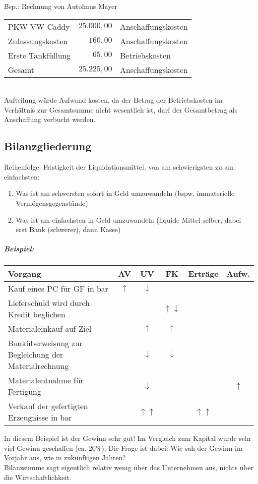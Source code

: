 \documentclass{scrreprt}
\begin{document}
\begin{itemize}
Bsp.: Rechnung von Autohaus Mayer\\
\begin{tabular}{l r l}
PKW VW Caddy & $25.000,00$ & Anschaffungskosten\\
Zulassungskosten & $160,00$ & Anschaffungskosten\\
Erste Tankfüllung & $65,00$ & Betriebskosten\\
\hline
Gesamt	& $25.225,00$	& Anschaffungskosten\\
\end{tabular}\\
Aufteilung würde Aufwand kosten, da der Betrag der Betriebskosten im Verhältnis zur Gesamtsumme nicht wesentlich ist, darf der Gesamtbetrag als Anschaffung verbucht werden.
\end{itemize}
\subsection{Bilanzgliederung}
Reihenfolge: Fristigkeit der Liquidationsmittel, von am schwierigsten zu am einfachsten: 
\begin{enumerate}
\item Was ist am schwersten sofort in Geld umzuwandeln (bspw. immaterielle Vermögensgegenstände)
\item Was ist am einfachsten in Geld umzuwandeln (liquide Mittel selber, dabei erst Bank (schwerer), dann Kasse)
\end{enumerate}
\subparagraph{Beispiel:} \parskp
\begin{tabular}{L{0.5} c c c c c}
Vorgang & AV & UV & FK & Erträge & Aufw.\\
\hline
Kauf eines PC für GF in bar & $\uparrow$ & $\downarrow$ \\
Lieferschuld wird durch Kredit beglichen & & & $\uparrow \downarrow$ \\
Materialeinkauf auf Ziel & & $\uparrow$ & $\uparrow$\\
Banküberweisung zur Begleichung der Materialrechnung & &$\downarrow$ & $\downarrow$\\
Materialentnahme für Fertigung & & $\downarrow$ & & & $\uparrow$\\
Verkauf der gefertigten Erzeugnisse in bar & &$\uparrow\uparrow$ & & $\uparrow\uparrow$ & \\
\end{tabular}
In diesem Beispiel ist der Gewinn sehr gut! Im Vergleich zum Kapital wurde sehr viel Gewinn geschaffen (ca. 20\%). Die Frage ist dabei: Wie sah der Gewinn im Vorjahr aus, wie in zukünftigen Jahren?\\
Bilanzsumme sagt eigentlich relativ wenig über das Unternehmen aus, nichts über die Wirtschaftlichkeit.
\end{document}
